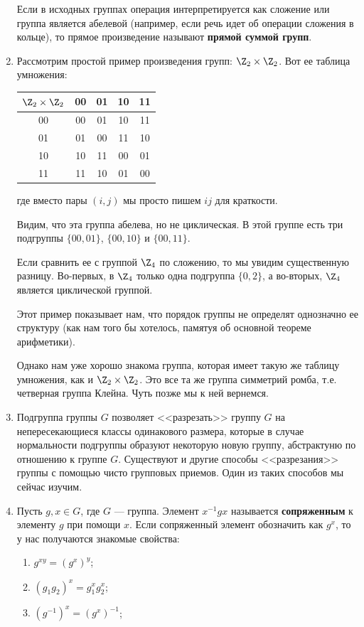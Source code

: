 \begin{enumerate}
Если в исходных группах операция интерпретируется как сложение или группа является абелевой (например, если речь идет об операции сложения в кольце), то прямое произведение называют \textbf{прямой суммой групп}.


\item Рассмотрим простой пример произведения групп: $\Z_2\times\Z_2$. Вот ее таблица умножения:

\begin{center}
\begin{tabular}{c|cccc}
$\Z_2\times\Z_2$ & 00 & 01 & 10 & 11\\  \hline
00 & 00 & 01 & 10 & 11 \\
01 & 01 & 00 & 11 & 10 \\
10 & 10 & 11 & 00 & 01 \\
11 & 11 & 10 & 01 & 00
\end{tabular}
\end{center}
где вместо пары $(i,j)$ мы просто пишем $ij$ для краткости.

Видим, что эта группа абелева, но не циклическая. В этой группе есть три подгруппы $\{00,01\}$, $\{00,10\}$ и $\{00,11\}$.

Если сравнить ее с группой $\Z_4$ по сложению, то мы увидим существенную разницу. Во-первых, в $\Z_4$ только одна подгруппа $\{0,2\}$, а во-вторых, $\Z_4$ является циклической группой.

Этот пример показывает нам, что порядок группы не определят однозначно ее структуру (как нам того бы хотелось, памятуя об основной теореме арифметики).

Однако нам уже хорошо знакома группа, которая имеет такую же таблицу умножения, как и $\Z_2\times\Z_2$. Это все та же группа симметрий ромба, т.е. четверная группа Клейна. Чуть позже мы к ней вернемся.




\item Подгруппа группы $G$ позволяет <<разрезать>> группу $G$ на непересекающиеся классы одинакового размера, которые в случае нормальности подгруппы образуют некоторую новую группу, абстрактуню по отношению к группе $G$. Существуют и другие способы <<разрезания>> группы с помощью чисто групповых приемов. Один из таких способов мы сейчас изучим.

\item Пусть $g,x\in G$, где $G$ --- группа. Элемент $x^{-1}gx$ называется \textbf{сопряженным} к элементу $g$ при помощи $x$. Если сопряженный элемент обозначить как $g^x$, то у нас получаются знакомые свойства:
\begin{enumerate}[1)]
\item $g^{xy}=(g^x)^y$;
\item $(g_1g_2)^x=g_1^xg_2^x$;
\item $(g^{-1})^x=(g^x)^{-1}$;
\end{enumerate}


\end{enumerate}

